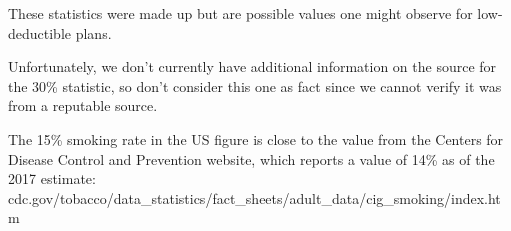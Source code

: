 \item[\ref{binomialModel}]
    These statistics were made up but are possible
    values one might observe for low-deductible plans.
\item[\ref{binomialModel}]
    Unfortunately, we don't currently have additional
    information on the source for the 30\% statistic,
    so don't consider this one as fact since we cannot
    verify it was from a reputable source.    
\item[\ref{binomialModel}]
    The 15\% smoking rate in the US figure is close to
    the value from the Centers for Disease Control and
    Prevention website, which reports a value of 14\%
    as of the 2017 estimate: \\
        {cdc.gov/tobacco/data\_statistics/fact\_sheets/adult\_data/cig\_smoking/index.htm}
